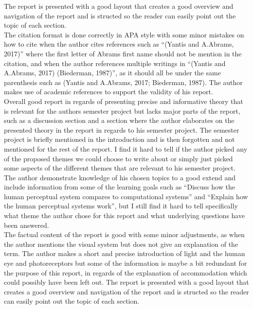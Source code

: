 \documentclass{article}
\begin{document}
The report is presented with a good layout that creates a good overview and navigation of the report and is structed so the reader can easily point out the topic of each section.\\

The citation format is done correctly in APA style with some minor mistakes on how to cite when the author cites references such as “(Yantis and A.Abrams, 2017)” where the first letter of Abrams first name should not be mention in the citation, and when the author references multiple writings in “(Yantis and A.Abrams, 2017) (Biederman, 1987)”, as it should all be under the same parenthesis such as (Yantis and A.Abrams, 2017; Biederman, 1987). The author makes use of academic references to support the validity of his report.\\

Overall good report in regards of presenting precise and informative theory that is relevant for the authors semester project but lacks major parts of the report, such as a discussion section and a section where the author elaborates on the presented theory in the report in regards to his semester project. The semester project is briefly mentioned in the introduction and is then forgotten and not mentioned for the rest of the report. I find it hard to tell if the author picked any of the proposed themes we could choose to write about or simply just picked some aspects of the different themes that are relevant to his semester project. The author demonstrate knowledge of his chosen topics to a good extend and include information from some of the learning goals such as “Discuss how the human perceptual system compares to computational systems” and “Explain how the human perceptual systems work”, but I still find it hard to tell specifically what theme the author chose for this report and what underlying questions have been answered.\\

The factual content of the report is good with some minor adjustments, as when the author mentions the visual system but does not give an explanation of the term. The author makes a short and precise introduction of light and the human eye and photoreceptors but some of the information is maybe a bit redundant for the purpose of this report, in regards of the explanation of accommodation which could possibly have been left out. The report is presented with a good layout that creates a good overview and navigation of the report and is structed so the reader can easily point out the topic of each section.\\
\end{document}
